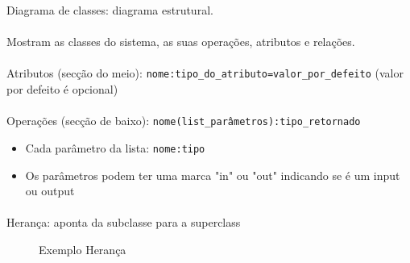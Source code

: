 \documentclass[../resumosLPOO.tex]{subfiles}
\begin{document}
 

Diagrama de classes: diagrama estrutural.

\paragraph{}

Mostram as classes do sistema, as suas operações, atributos e relações.

\paragraph{}

Atributos (secção do meio): \lstinline{nome:tipo_do_atributo=valor_por_defeito} (valor por defeito é opcional)

\paragraph{}

Operações (secção de baixo): \lstinline{nome(list_parâmetros):tipo_retornado}
\begin{itemize}
    \item Cada parâmetro da lista: \lstinline{nome:tipo}
    \item Os parâmetros podem ter uma marca "in" ou "out" indicando se é um input ou output
\end{itemize}

\paragraph{}

Herança: aponta da subclasse para a superclass

\begin{figure}[H]
    \centering
    \caption{Exemplo Herança\label{fig:inheritance}}
\end{figure}

\paragraph{}
\end{document}
